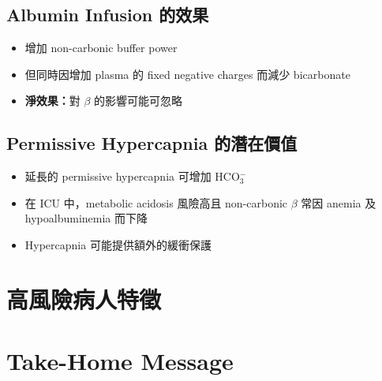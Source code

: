 \documentclass[12pt,a4paper]{article}
\begin{document}
\subsection{Albumin Infusion 的效果}

\begin{itemize}
    \item 增加 non-carbonic buffer power
    \item 但同時因增加 plasma 的 fixed negative charges 而減少 bicarbonate
    \item \textbf{淨效果：}對 $\beta$ 的影響可能可忽略
\end{itemize}

\subsection{Permissive Hypercapnia 的潛在價值}

\begin{itemize}
    \item 延長的 permissive hypercapnia 可增加 HCO$_3^-$
    \item 在 ICU 中，metabolic acidosis 風險高且 non-carbonic $\beta$ 常因 anemia 及 hypoalbuminemia 而下降
    \item Hypercapnia 可能提供額外的緩衝保護
\end{itemize}

\section{高風險病人特徵}


\section{Take-Home Message}
\end{document}
